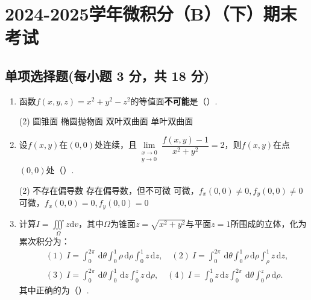 \documentclass[../main.tex]{subfiles}
\begin{document}
\chapter{2024-2025学年微积分（B）（下）期末考试}

\section{单项选择题(每小题 3 分，共 18 分)}
\begin{enumerate}
  \item 函数$f(x,y,z)=x^2+y^2-z^2$的等值面\textbf{不可能}是（\qquad）.

        \begin{tasks}[label=\textbf{\Alph*.}, label-width=1.5em, column-sep=1em](2)
          \task 圆锥面
          \task 椭圆抛物面
          \task 双叶双曲面
          \task 单叶双曲面
        \end{tasks}

  \item 设$f(x,y)$在$(0,0)$处连续，且$\lim\limits_{\substack{x \to 0 \\ y \to 0}}\dfrac{f(x,y)-1}{x^2+y^2}=2$，则$f(x,y)$在点$(0,0)$处（\qquad）.

        \begin{tasks}[label=\textbf{\Alph*.}, label-width=1.5em, column-sep=1em](2)
          \task 不存在偏导数
          \task 存在偏导数，但不可微
          \task 可微，$f_x(0,0)\neq 0,f_y(0,0)\neq 0$
          \task 可微，$f_x(0,0)=0,f_y(0,0)=0$
        \end{tasks}

  \item \begin{minipage}[t]{0.93\linewidth}
          计算$I=\displaystyle \iiint \limits_\Omega z \mathrm{d}v$，其中$\Omega$为锥面$z=\sqrt{x^2+y^2}$与平面$z=1$所围成的立体，化为累次积分为：
          \[
            \begin{aligned}
               & (1)\ I=\int_0^{2\pi}\,\mathrm{d}\theta\int_0^1\rho\,\mathrm{d}\rho\int_0^1z\,\mathrm{d}z,\quad
              (2)\ I=\int_0^{2\pi}\,\mathrm{d}\theta\int_0^1\rho\,\mathrm{d}\rho\int_\rho^1z\,\mathrm{d}z,      \\
               & (3)\ I=\int_0^{2\pi}\,\mathrm{d}\theta\int_0^1\,\mathrm{d}z\int_0^z z\,\mathrm{d}\rho,\quad
              (4)\ I=\int_0^1z\,\mathrm{d}z\int_0^{2\pi}\,\mathrm{d}\theta\int_0^z\rho\,\mathrm{d}\rho.
            \end{aligned}
          \]
          其中正确的为（\qquad）.


\end{minipage}
\end{enumerate}
\end{document}
